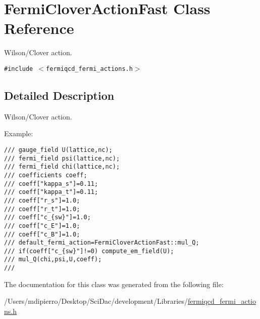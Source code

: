 \hypertarget{class_fermi_clover_action_fast}{
\section{FermiCloverActionFast Class Reference}
\label{class_fermi_clover_action_fast}
}
Wilson/Clover action.  


{\tt \#include $<$fermiqcd\_\-fermi\_\-actions.h$>$}



\subsection{Detailed Description}
Wilson/Clover action. 

Example: 

\footnotesize\begin{verbatim}
/// gauge_field U(lattice,nc);
/// fermi_field psi(lattice,nc);
/// fermi_field chi(lattice,nc);
/// coefficients coeff;
/// coeff["kappa_s"]=0.11;
/// coeff["kappa_t"]=0.11;
/// coeff["r_s"]=1.0;
/// coeff["r_t"]=1.0;
/// coeff["c_{sw}"]=1.0;
/// coeff["c_E"]=1.0;
/// coeff["c_B"]=1.0;
/// default_fermi_action=FermiCloverActionFast::mul_Q;
/// if(coeff["c_{sw}"]!=0) compute_em_field(U);
/// mul_Q(chi,psi,U,coeff);
/// \end{verbatim}
\normalsize
 

The documentation for this class was generated from the following file:\begin{CompactItemize}
\item 
/Users/mdipierro/Desktop/SciDac/development/Libraries/\hyperlink{fermiqcd__fermi__actions_8h}{fermiqcd\_\-fermi\_\-actions.h}\end{CompactItemize}
